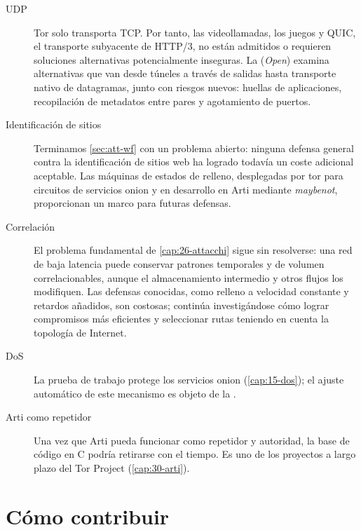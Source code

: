 \begin{description}
  \item[UDP] Tor solo transporta TCP. Por tanto, las videollamadas, los juegos y QUIC, el transporte subyacente de HTTP/3, no están admitidos o requieren soluciones alternativas potencialmente inseguras. La  (\emph{Open}) examina alternativas que van desde túneles a través de salidas hasta transporte nativo de datagramas, junto con riesgos nuevos: huellas de aplicaciones, recopilación de metadatos entre pares y agotamiento de puertos.
  \item[Identificación de sitios] Terminamos \cref{sec:att-wf} con un problema abierto: ninguna defensa general contra la identificación de sitios web ha logrado todavía un coste adicional aceptable. Las máquinas de estados de relleno, desplegadas por tor para circuitos de servicios onion y en desarrollo en Arti mediante \emph{maybenot}, proporcionan un marco para futuras defensas.
  \item[Correlación] El problema fundamental de \cref{cap:26-attacchi} sigue sin resolverse: una red de baja latencia puede conservar patrones temporales y de volumen correlacionables, aunque el almacenamiento intermedio y otros flujos los modifiquen. Las defensas conocidas, como relleno a velocidad constante y retardos añadidos, son costosas; continúa investigándose cómo lograr compromisos más eficientes y seleccionar rutas teniendo en cuenta la topología de Internet.
  \item[DoS] La prueba de trabajo protege los servicios onion (\cref{cap:15-dos}); el ajuste automático de este mecanismo es objeto de la .
  \item[Arti como repetidor] Una vez que Arti pueda funcionar como repetidor y autoridad, la base de código en C podría retirarse con el tiempo. Es uno de los proyectos a largo plazo del Tor Project (\cref{cap:30-arti}).
\end{description}

\section{Cómo contribuir}\label{sec:fut-contribuire}

